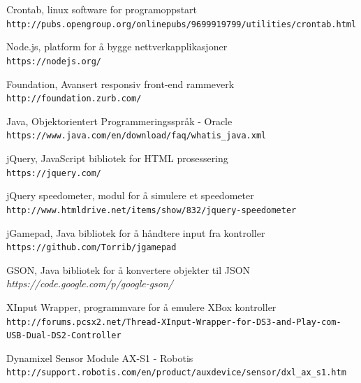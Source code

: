 \documentclass[12pt]{report}
\begin{document}
\begin{thebibliography}{3}
	Crontab, linux software for programoppstart 
	\\\texttt{http://pubs.opengroup.org/onlinepubs/9699919799/utilities/crontab.html}
	
	Node.js, platform for å bygge nettverkapplikasjoner
	\\\texttt{https://nodejs.org/}

	Foundation, Avansert responsiv front-end rammeverk
	\\\texttt{http://foundation.zurb.com/}

	Java, Objektorientert Programmeringsspråk - Oracle
	\\\texttt{https://www.java.com/en/download/faq/whatis\_java.xml}
	
	jQuery, JavaScript bibliotek for HTML prosessering
	\\\texttt{https://jquery.com/}

	jQuery speedometer, modul for å simulere et speedometer
	\\\texttt{http://www.htmldrive.net/items/show/832/jquery-speedometer}

	jGamepad, Java bibliotek for å håndtere input fra kontroller
	\\\texttt{https://github.com/Torrib/jgamepad}

	GSON, Java bibliotek for å konvertere objekter til JSON
	\\\textit{https://code.google.com/p/google-gson/}

	XInput Wrapper, programmvare for å emulere XBox kontroller
	\\\texttt{http://forums.pcsx2.net/Thread-XInput-Wrapper-for-DS3-and-Play-com-USB-Dual-DS2-Controller}
	
	Dynamixel Sensor Module AX-S1 - Robotis
	\\\texttt{http://support.robotis.com/en/product/auxdevice/sensor/dxl\_ax\_s1.htm}

\end{thebibliography}

\clearpage

\medskip
\end{document}
